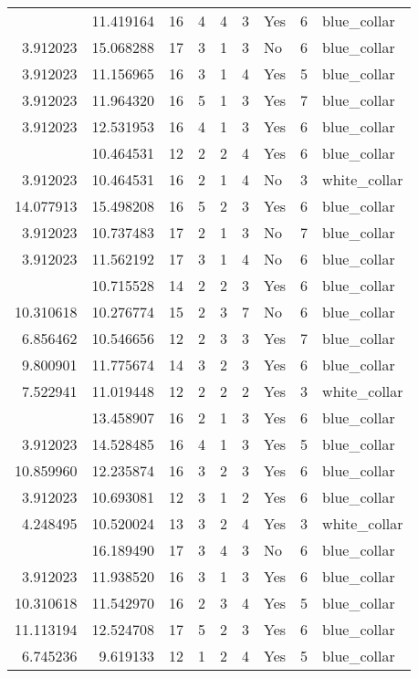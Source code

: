 \documentclass[
]{article}
\begin{document}
\begin{longtable}[t]{rrrrrllrl}
\addlinespace
8.022897 & 11.419164 & 16 & 4 & 4 & 3 & Yes & 6 & blue\_collar\\
3.912023 & 15.068288 & 17 & 3 & 1 & 3 & No & 6 & blue\_collar\\
3.912023 & 11.156965 & 16 & 3 & 1 & 4 & Yes & 5 & blue\_collar\\
3.912023 & 11.964320 & 16 & 5 & 1 & 3 & Yes & 7 & blue\_collar\\
3.912023 & 12.531953 & 16 & 4 & 1 & 3 & Yes & 6 & blue\_collar\\
\addlinespace
8.354674 & 10.464531 & 12 & 2 & 2 & 4 & Yes & 6 & blue\_collar\\
3.912023 & 10.464531 & 16 & 2 & 1 & 4 & No & 3 & white\_collar\\
14.077913 & 15.498208 & 16 & 5 & 2 & 3 & Yes & 6 & blue\_collar\\
3.912023 & 10.737483 & 17 & 2 & 1 & 3 & No & 7 & blue\_collar\\
3.912023 & 11.562192 & 17 & 3 & 1 & 4 & No & 6 & blue\_collar\\
\addlinespace
6.956545 & 10.715528 & 14 & 2 & 2 & 3 & Yes & 6 & blue\_collar\\
10.310618 & 10.276774 & 15 & 2 & 3 & 7 & No & 6 & blue\_collar\\
6.856462 & 10.546656 & 12 & 2 & 3 & 3 & Yes & 7 & blue\_collar\\
9.800901 & 11.775674 & 14 & 3 & 2 & 3 & Yes & 6 & blue\_collar\\
7.522941 & 11.019448 & 12 & 2 & 2 & 2 & Yes & 3 & white\_collar\\
\addlinespace
3.912023 & 13.458907 & 16 & 2 & 1 & 3 & Yes & 6 & blue\_collar\\
3.912023 & 14.528485 & 16 & 4 & 1 & 3 & Yes & 5 & blue\_collar\\
10.859960 & 12.235874 & 16 & 3 & 2 & 3 & Yes & 6 & blue\_collar\\
3.912023 & 10.693081 & 12 & 3 & 1 & 2 & Yes & 6 & blue\_collar\\
4.248495 & 10.520024 & 13 & 3 & 2 & 4 & Yes & 3 & white\_collar\\
\addlinespace
16.045530 & 16.189490 & 17 & 3 & 4 & 3 & No & 6 & blue\_collar\\
3.912023 & 11.938520 & 16 & 3 & 1 & 3 & Yes & 6 & blue\_collar\\
10.310618 & 11.542970 & 16 & 2 & 3 & 4 & Yes & 5 & blue\_collar\\
11.113194 & 12.524708 & 17 & 5 & 2 & 3 & Yes & 6 & blue\_collar\\
6.745236 & 9.619133 & 12 & 1 & 2 & 4 & Yes & 5 & blue\_collar\\

\end{longtable}
\end{document}
